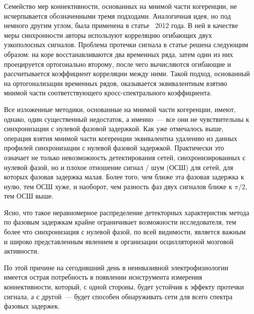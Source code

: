 Семейство мер коннективности, основанных на мнимой части когеренции, не
исчерпывается обозначенными тремя подходами. Аналогичная идея, но под немного
другим углом, была применена в статье~\cite{Hipp2012} 2012 года. В ней в
качестве меры синхронности авторы используют корреляцию огибающих двух
узкополосных сигналов. Проблема протечки сигнала в статье решена следующим
образом: на коре восстанавливаются два временных ряда, затем один из них
проецируется ортогонально второму, после чего вычисляются огибающие и
рассчитывается коэффициент корреляции между ними.  Такой подход, основанный на
ортогонализации временных рядов, оказывается эквивалентным взятию мнимой части
соответствующего кросс-спектрального коэффициента.



Все изложенные методики, основанные на мнимой части когеренции, имеют, однако,
один существенный недостаток, а именно~--- все они не чувствительны к
синхронизации с нулевой фазовой задержкой. Как уже отмечалось выше, операция
взятия мнимой части когеренции эквивалентна удалению из данных профилей
синхронизации с нулевой фазовой задержкой. Практически это означает не только
невозможность детектирования сетей, синхронизированных с нулевой фазой, но и
плохое отношение сигнал / шум (ОСШ) для сетей, для которых фазовая задержка
малая. Более того, чем ближе эта фазовая задержка к нулю, тем ОСШ хуже, и
наоборот, чем разность фаз двух сигналов ближе к $\pi / 2$, тем ОСШ выше.

Ясно, что такое неравномерное распределение детекторных характеристик метода по
фазовым задержкам крайне ограничивает возможности исследователя, тем более что
синхронизация с нулевой фазой, по всей видимости, является важным и широко представленным
явлением в организации осцилляторной мозговой активности.

По этой причине на сегодняшний день в неинвазивной электрофизиологии имеется
острая потребность в появлении иснструмента измерения коннективности, который,
с одной стороны, будет устойчив к эффекту протечки сигнала, а с другой~---
будет способен обнаруживать сети для всего спектра фазовых задержек.


